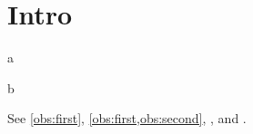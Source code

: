 \section{Intro}
\begin{oblemma}\label{obs:first}
a
\end{oblemma}
\begin{oblemma}[Second]\label{obs:second}
b
\end{oblemma}
See \autoref{obs:first}, \cref{obs:first,obs:second}, , and .
